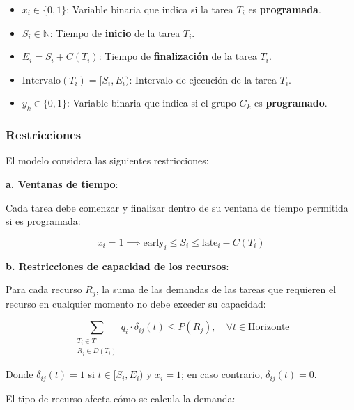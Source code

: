 \documentclass{article}
\begin{document}
\vspace{0.5cm}

\begin{tcolorbox}[colback=gray!5!white, colframe=gray!75!black, title={Variables de decisión}]
    \begin{itemize}
        \item \( x_i \in \{0, 1\} \): Variable binaria que indica si la tarea \( T_i \) es \textbf{programada}.
        \item \( S_i \in \mathbb{N} \): Tiempo de \textbf{inicio} de la tarea \( T_i \).
        \item \( E_i = S_i + C(T_i) \): Tiempo de \textbf{finalización} de la tarea \( T_i \).
        \item \( \text{Intervalo}(T_i) = [S_i, E_i) \): Intervalo de ejecución de la tarea \( T_i \).
        \item \( y_k \in \{0, 1\} \): Variable binaria que indica si el grupo \( G_k \) es \textbf{programado}.
    \end{itemize}
\end{tcolorbox}

\vspace{0.5cm}

\subsubsection{Restricciones}

El modelo considera las siguientes restricciones:

\textbf{a. Ventanas de tiempo}:

Cada tarea debe comenzar y finalizar dentro de su ventana de tiempo permitida si es programada:

\[
x_i = 1 \implies \text{early}_i \leq S_i \leq \text{late}_i - C(T_i)
\]

\textbf{b. Restricciones de capacidad de los recursos}:

Para cada recurso \( R_j \), la suma de las demandas de las tareas que requieren el recurso en cualquier momento no debe exceder su capacidad:

\[
\sum_{\substack{T_i \in T \\ R_j \in D(T_i)}} q_i \cdot \delta_{ij}(t) \leq P(R_j), \quad \forall t \in \text{Horizonte}
\]

Donde \( \delta_{ij}(t) = 1 \) si \( t \in [S_i, E_i) \) y \( x_i = 1 \); en caso contrario, \( \delta_{ij}(t) = 0 \).

El tipo de recurso afecta cómo se calcula la demanda:
\end{document}
